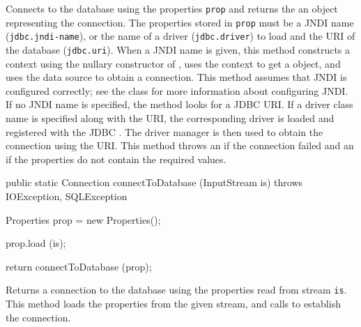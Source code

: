 \begin{tabb}
   Connects to the database using the properties \texttt{prop} and returns the 
   an object representing the connection.
   The properties stored in \texttt{prop} must be a JNDI name
    (\texttt{jdbc.jndi-name}), or the name of a driver
   (\texttt{jdbc.driver}) to load and the URI of the database (\texttt{jdbc.uri}).
   When a JNDI name is given, this method constructs a
   context using the nullary constructor of ,
   uses the context to get a  object,
   and uses the data source to obtain a connection.
    This method assumes that JNDI is configured correctly;
   see the class  for more information about configuring
   JNDI.
   If no JNDI name is specified, the method looks for a JDBC URI.
   If a driver class name is specified along with the URI, the corresponding driver
   is loaded and registered with the JDBC .
   The driver manager is then used to obtain the connection using the URI.
 This method throws
   an  if the connection failed and an
   if the properties do not contain the required values.
\end{tabb}
\begin{htmlonly}
\end{htmlonly}
\begin{code}

   public static Connection connectToDatabase (InputStream is)
            throws IOException, SQLException \begin{hide} {
      Properties prop = new Properties();
        
      prop.load (is);
        
      return connectToDatabase (prop);
   }\end{hide}
\end{code}
\begin{tabb}
   Returns a connection to the database using the properties read from stream \texttt{is}.
   This method loads the properties from the given stream, and
   calls  to establish the connection.
\end{tabb}
\begin{htmlonly}
\end{htmlonly}
